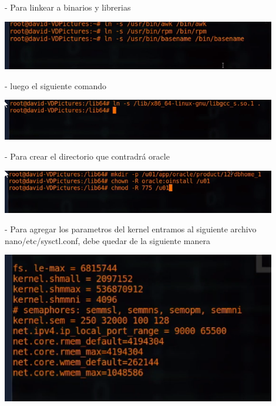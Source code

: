 \documentclass[12pt,letterpaper]{article}
\begin{document}
\begin{itemize}
- Para linkear a binarios y librerias\\
\end{itemize}

\begin{center}
	\includegraphics[width=12cm]{./Imagenes/34} 
\end{center}


\begin{itemize}
- luego el siguiente comando\\
\end{itemize}

\begin{center}
	\includegraphics[width=12cm]{./Imagenes/35} 
\end{center}


\begin{itemize}
- Para crear el directorio que contradrá oracle\\
\end{itemize}

\begin{center}
	\includegraphics[width=12cm]{./Imagenes/36} 
\end{center}



\begin{itemize}
- Para agregar los parametros del kernel entramos al siguiente archivo nano/etc/sysctl.conf, debe quedar de la siguiente manera\\
\end{itemize}

\begin{center}
	\includegraphics[width=12cm]{./Imagenes/37} 
\end{center}
\end{document}
